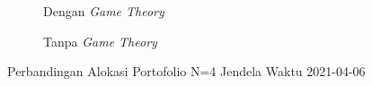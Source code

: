 %         
% 
% 
%         
% 
% 

\begin{figure}[!htbp]
    \centering
    \begin{subfigure}[b]{0.48\textwidth}
        \centering
        


        \caption{Dengan \textit{Game Theory}}
    \end{subfigure}
    \hfill
    \begin{subfigure}[b]{0.48\textwidth}
        \centering
        


        \caption{Tanpa \textit{Game Theory}}
    \end{subfigure}
    \caption{Perbandingan Alokasi Portofolio N=4 Jendela Waktu 2021-04-06}
    \label{fig:window_n4_2021_04_06}
\end{figure}

%         
% 
% 
%         
% 
% 

